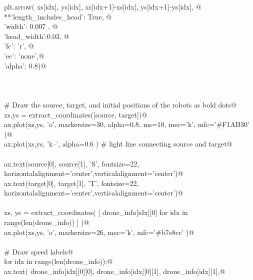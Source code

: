 \documentclass[10.0pt]{report}
\begin{document}
\begin{flushleft}
\begin{list}{}{}
\mbox{}\verb@          plt.arrow( xs[idx], ys[idx], xs[idx+1]-xs[idx], ys[idx+1]-ys[idx], @\\
\mbox{}\verb@                    **{'length_includes_head': True, @\\
\mbox{}\verb@                       'width': 0.007 , @\\
\mbox{}\verb@                       'head_width':0.03, @\\
\mbox{}\verb@                       'fc': 'r', @\\
\mbox{}\verb@                       'ec': 'none',@\\
\mbox{}\verb@                       'alpha': 0.8})@\\
\mbox{}\verb@@\\
\mbox{}\verb@@\\
\mbox{}\verb@@\\
\mbox{}\verb@    # Draw the source, target, and initial positions of the robots as bold dots@\\
\mbox{}\verb@    xs,ys = extract_coordinates([source, target])@\\
\mbox{}\verb@    ax.plot(xs,ys, 'o', markersize=30, alpha=0.8, ms=10, mec='k', mfc='#F1AB30' )@\\
\mbox{}\verb@    ax.plot(xs,ys, 'k--', alpha=0.6 ) # light line connecting source and target@\\
\mbox{}\verb@@\\
\mbox{}\verb@    ax.text(source[0], source[1], 'S', fontsize=22,\@\\
\mbox{}\verb@            horizontalalignment='center',verticalalignment='center')@\\
\mbox{}\verb@    ax.text(target[0], target[1], 'T', fontsize=22,\@\\
\mbox{}\verb@            horizontalalignment='center',verticalalignment='center')@\\
\mbox{}\verb@@\\
\mbox{}\verb@    xs, ys = extract_coordinates( [ drone_info[idx][0] for idx in range(len(drone_info)) ]  )@\\
\mbox{}\verb@    ax.plot(xs,ys, 'o', markersize=26, mec='k', mfc='#b7e8cc' )@\\
\mbox{}\verb@@\\
\mbox{}\verb@    # Draw speed labels@\\
\mbox{}\verb@    for idx in range(len(drone_info)):@\\
\mbox{}\verb@         ax.text( drone_info[idx][0][0], drone_info[idx][0][1], drone_info[idx][1],@\\

\end{list}
\end{flushleft}
\end{document}
